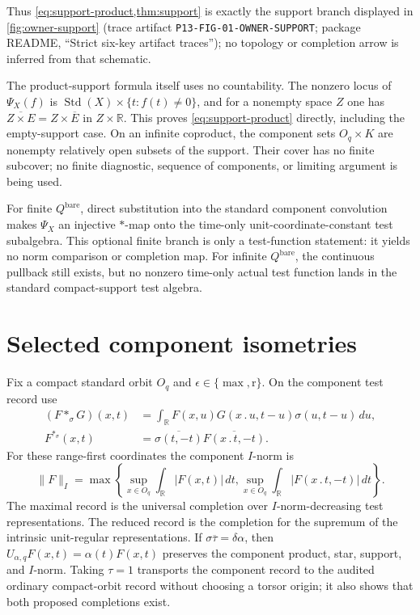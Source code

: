 \documentclass[11pt]{article}
\theoremstyle{definition}
\newcommand{\R}{\mathbb R}
\newcommand{\Qbare}{Q^{\mathrm{bare}}}
\newcommand{\Std}{\operatorname{Std}}
\newcommand{\TraceRef}[1]{(trace artifact \nolinkurl{#1}; package README,
``Strict six-key artifact traces'')}
\begin{document}
Thus \cref{eq:support-product,thm:support} is exactly the support branch
displayed in \cref{fig:owner-support}
\TraceRef{P13-FIG-01-OWNER-SUPPORT}; no topology or completion arrow is
inferred from that schematic.

The product-support formula itself uses no countability.  The nonzero locus
of $\Psi_X(f)$ is
$\Std(X)\times\{t:f(t)\ne0\}$, and for a nonempty space $Z$ one has
$\overline{Z\times E}=Z\times\overline E$ in $Z\times\R$.  This proves
\cref{eq:support-product} directly, including the empty-support case.  On an
infinite coproduct, the component sets $O_q\times K$ are nonempty relatively
open subsets of the support.  Their cover has no finite subcover; no finite
diagnostic, sequence of components, or limiting argument is being used.

For finite $\Qbare$, direct substitution into the standard component
convolution makes $\Psi_X$ an injective $*$-map onto the time-only
unit-coordinate-constant test subalgebra.  This optional finite branch is
only a test-function statement: it yields no norm comparison or completion
map.  For infinite $\Qbare$, the continuous pullback still exists, but no
nonzero time-only actual test function lands in the standard compact-support
test algebra.

\section{Selected component isometries}\label{sec:components}

Fix a compact standard orbit $O_q$ and
$\epsilon\in\{\max,\mathrm r\}$.  On the component test record use
\begin{align*}
 (F*_{\sigma}G)(x,t)
  &=\int_{\R}F(x,u)G(x\mathbin{.}u,t-u)
       \sigma(u,t-u)\,du,\\
 F^{*_{\sigma}}(x,t)
  &=\overline{\sigma(t,-t)}
       \overline{F(x\mathbin{.}t,-t)}.
\end{align*}
For these range-first coordinates the component $I$-norm is
\[
 \lVert F\rVert_I=\max\left\{
 \sup_{x\in O_q}\int_{\R}|F(x,t)|\,dt,
 \sup_{x\in O_q}\int_{\R}|F(x\mathbin{.}t,-t)|\,dt
 \right\}.
\]
The maximal record is the universal completion over $I$-norm-decreasing
test representations.  The reduced record is the completion for the
supremum of the intrinsic unit-regular representations.  If
$\sigma\overline\tau=\delta\alpha$, then
$U_{\alpha,q}F(x,t)=\alpha(t)F(x,t)$ preserves the component product, star,
support, and $I$-norm.  Taking $\tau=1$ transports the component record to
the audited ordinary compact-orbit record without choosing a torsor origin;
it also shows that both proposed completions exist.
\end{document}
